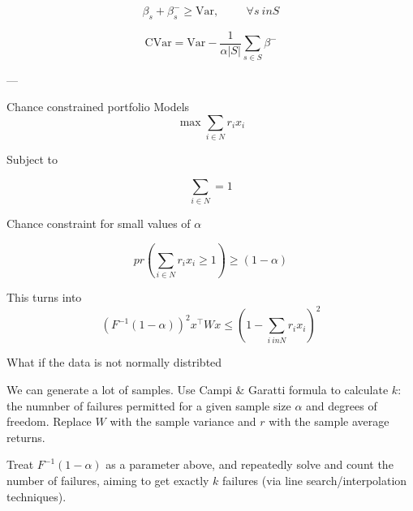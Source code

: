\[ \beta_s + \beta_s^{-} \ge \text{Var}, \hspace{1cm} \forall s \ in S \]

\[ \text{CVar} = \text{Var} - \frac{1}{\alpha |S|} \sum_{s \in S} \beta^{-} \]

---

Chance constrained portfolio Models
\[ \max \sum_{i \in N} r_i x_i \]

Subject to

\[ \sum_{i \in N} = 1 \]

Chance constraint for small values of $\alpha$

\[ pr\left(\sum_{i \in N} r_i x_i \ge 1\right) \ge (1 - \alpha) \]

This turns into 
\[ \left(F^{-1} \left(1 - \alpha \right)\right)^2 x^\top W x \le \left(1 - \sum_{i \ in N} r_i x_i \right)^2 \]


What if the data is not normally distribted

We can generate a lot of samples.
Use Campi & Garatti formula to calculate $k$: the numnber of failures permitted for a given sample size
$\alpha$ and degrees of freedom. Replace $W$ with the sample variance and $r$ with the sample average returns. 

Treat $F^{-1}(1-\alpha)$ as a parameter above, and repeatedly solve and count the number of failures, 
aiming to get exactly $k$ failures (via line search/interpolation techniques).

